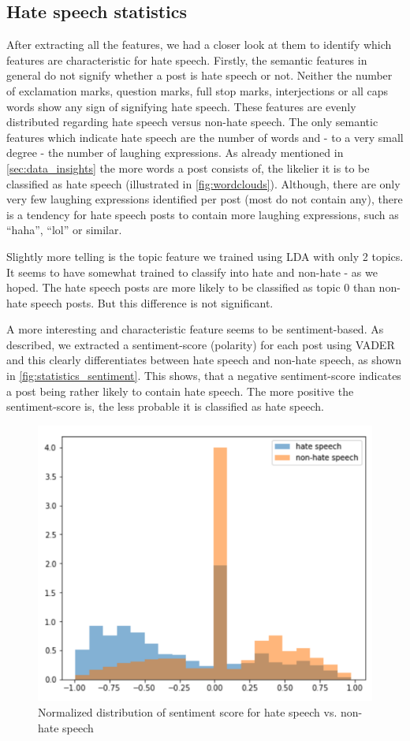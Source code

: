 \subsection{Hate speech statistics}
\label{ch:experimentDb}

After extracting all the features, we had a closer look at them to identify which features are characteristic for hate speech.
Firstly, the semantic features in general do not signify whether a post is hate speech or not. Neither the number of exclamation marks, question marks, full stop marks, interjections or all caps words show any sign of signifying hate speech. These features are evenly distributed regarding hate speech versus non-hate speech.
The only semantic features which indicate hate speech are the number of words and - to a very small degree - the number of laughing expressions.
As already mentioned in \autoref{sec:data_insights} the more words a post consists of, the likelier it is to be classified as hate speech (illustrated in \autoref{fig:wordclouds}).
Although, there are only very few laughing expressions identified per post (most do not contain any), there is a tendency for hate speech posts to contain more laughing expressions, such as \enquote{haha}, \enquote{lol} or similar.

Slightly more telling is the topic feature we trained using LDA with only 2 topics. It seems to have somewhat trained to classify into hate and non-hate - as we hoped. The hate speech posts are more likely to be classified as topic 0 than non-hate speech posts. But this difference is not significant.

A more interesting and characteristic feature seems to be sentiment-based. As described, we extracted a sentiment-score (polarity) for each post using VADER and this clearly differentiates between hate speech and non-hate speech, as shown in \autoref{fig:statistics_sentiment}.
This shows, that a negative sentiment-score indicates a post being rather likely to contain hate speech. The more positive the sentiment-score is, the less probable it is classified as hate speech.

\begin{figure}[ht]
	\centering
	\includegraphics[width=0.7\linewidth]{figures/statistics_sentiment.png}
	\caption{Normalized distribution of sentiment score for hate speech vs. non-hate speech}
	\label{fig:statistics_sentiment}
\end{figure}

